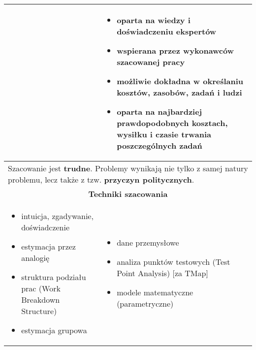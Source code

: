 \documentclass[../main.tex]{subfiles}
\begin{document}
\begin{table}[H]
\begin{center}
\begin{tabular}{| p{8cm} | p{8cm} |}
                &
                \begin{itemize}
                    \item oparta na wiedzy i doświadczeniu ekspertów
                    \item wspierana przez wykonawców szacowanej pracy
                    \item możliwie dokładna w określaniu kosztów, zasobów, zadań i ludzi
                    \item oparta na najbardziej prawdopodobnych kosztach, wysiłku i czasie trwania poszczególnych zadań
                \end{itemize}
                \\
                \hline
                \multicolumn{2}{|p{16cm}|}{Szacowanie jest \textbf{trudne}. Problemy wynikają nie tylko z samej natury problemu, lecz także z tzw. \textbf{przyczyn politycznych}.
                }\\
                \hline
                \hline
                \multicolumn{2}{|c|}{\textbf{Techniki szacowania}}\\
                \hline
                \begin{itemize}
                    \item intuicja, zgadywanie, doświadczenie
                    \item estymacja przez analogię
                    \item struktura podziału prac (Work Breakdown Structure)
                    \item estymacja grupowa
                \end{itemize}
                &
                \begin{itemize}
                    \item dane przemysłowe
                    \item analiza punktów testowych (Test Point Analysis) [za TMap]
                    \item modele matematyczne (parametryczne)
                \end{itemize}\\
                \hline
            \end{tabular}
        \end{center}
    \end{table}
\end{document}
